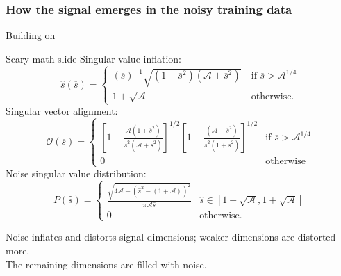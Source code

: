 \documentclass{beamer}
\begin{document}
\begin{frame}[label=signal_from_noise]
\frametitle{How the signal emerges in the noisy training data}
\vspace{-0.5em}
\begin{center}%
%
%
%
\end{center}
\vspace{-1em}
{\footnotesize Building on \citet{Benaych-Georges2012}}
\end{frame}


\begin{frame}{Scary math slide}
Singular value inflation:
$$
\hat{s}(\overline{s}) = \begin{cases}
{(\overline{s})^{-1}}{\sqrt{(1+\overline{s}^2)(\mathcal{A}+\overline{s}^2)}}\ & \text{if } \overline{s} > \mathcal{A}^{1/4} \\
1+\sqrt{\mathcal{A}} & \text{otherwise}.
\end{cases}
$$
Singular vector alignment:
$$\mathcal{O}(\overline{s}) = 
\begin{cases}
\left[1-
        \frac{\mathcal{A}(1+\overline{s}^2)}          
            {\overline{s}^2(\mathcal{A}+\overline{s}^2)}
\right]^{1/2} 
\left[1-
        \frac{(\mathcal{A}+\overline{s}^2)}          
            {\overline{s}^2(1+\overline{s}^2)}
\right]^{1/2}

& \text{if } \overline{s} > \mathcal{A}^{1/4} \\
0 & \text{otherwise}
\end{cases}
$$
Noise singular value distribution:
$$P(\hat{s}) = \begin{cases}
\frac{\sqrt{4\mathcal{A}-(\hat{s}^2 - (1+\mathcal{A}))^2}}{\pi \mathcal{A}\hat{s}} & \hat{s} \in [1-\sqrt{\mathcal{A}}, 1+\sqrt{\mathcal{A}}] \\
0 & \text{otherwise}.
\end{cases}
$$
\end{frame}

\begin{frame}[standout]
Noise inflates and distorts signal dimensions; weaker dimensions are distorted more. \\[1em]
The remaining dimensions are filled with noise.
\end{frame}
\end{document}
